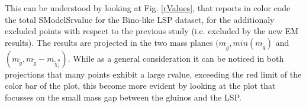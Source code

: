 \documentclass[a4paper,10pt]{article}
\newcommand{\SMO}{{\sc SModelS}}
\newcommand{\MSQ}{$ m _{ \tilde q } $\xspace}
\begin{document}
This can be understood by looking at Fig. \ref{rValues}, that reports in color code the total \SMO rvalue for the Bino-like LSP dataset, for the additionaly excluded points with respect to the previous study (i.e. excluded by the new EM results). The results are projected in the two mass planes $(m_{\tilde{g}},min(m_{\tilde q})$ and $(m_{\tilde{g}}, m_{\tilde{g}} - m_{\tilde \chi _1 ^0 })$. While as a general consideration it can be noticed in both projections that many points exhibit a large rvalue, exceeding the red limit of the color bar of the plot, this become more evident by looking at the plot that focusses on the small mass gap between the gluinos and the LSP. 
\\
%
%
%
%
%
%
\end{document}
